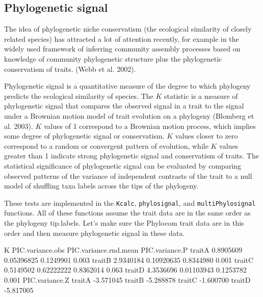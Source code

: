 \documentclass[12pt]{article}
\begin{document}
\subsection{Phylogenetic signal}

The idea of phylogenetic niche conservatism (the ecological similarity of closely related species) has attracted a lot of attention recently, for example in the widely used framework of inferring community assembly processes based on knowledge of community phylogenetic structure plus the phylogenetic conservatism of traits. (Webb et al. 2002).

Phylogenetic signal is a quantitative measure of the degree to which phylogeny predicts the ecological similarity of species. The $K$ statistic is a measure of phylogenetic signal that compares the observed signal in a trait to the signal under a Brownian motion model of trait evolution on a phylogeny (Blomberg et al. 2003). $K$ values of 1 correspond to a Brownian motion process, which implies some degree of phylogenetic signal or conservatism. $K$ values closer to zero correspond to a random or convergent pattern of evolution, while $K$ values greater than 1 indicate strong phylogenetic signal and conservatism of traits. The statistical significance of phylogenetic signal can be evaluated by comparing observed patterns of the variance of independent contrasts of the trait to a null model of shuffling taxa labels across the tips of the phylogeny.

These tests are implemented in the \texttt{Kcalc}, \texttt{phylosignal}, and \texttt{multiPhylosignal} functions. All of these functions assume the trait data are in the same order as the phylogeny tip.labels. Let's make sure the Phylocom trait data are in this order and then measure phylogenetic signal in these data.

\begin{Schunk}
\begin{Soutput}
               K PIC.variance.obs PIC.variance.rnd.mean PIC.variance.P
traitA 0.8905609       0.05396825             0.1249901          0.003
traitB 2.9340184       0.10920635             0.8344980          0.001
traitC 0.5149502       0.62222222             0.8362014          0.063
traitD 4.3536696       0.01103943             0.1253782          0.001
       PIC.variance.Z
traitA      -3.571045
traitB      -5.288878
traitC      -1.600700
traitD      -5.817005
\end{Soutput}
\end{Schunk}
\end{document}
